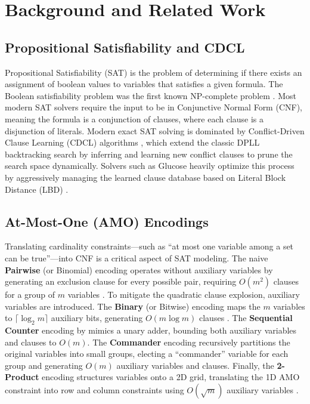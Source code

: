 \section{Background and Related Work}
\label{sec:background}

\subsection{Propositional Satisfiability and CDCL}
Propositional Satisfiability (SAT) is the problem of determining if there exists an assignment of boolean values to variables that satisfies a given formula. The Boolean satisfiability problem was the first known NP-complete problem \citep{cook1971complexity}. Most modern SAT solvers require the input to be in Conjunctive Normal Form (CNF), meaning the formula is a conjunction of clauses, where each clause is a disjunction of literals. Modern exact SAT solving is dominated by Conflict-Driven Clause Learning (CDCL) algorithms \citep{marques2009conflict}, which extend the classic DPLL backtracking search by inferring and learning new conflict clauses to prune the search space dynamically. Solvers such as Glucose heavily optimize this process by aggressively managing the learned clause database based on Literal Block Distance (LBD) \citep{audemard2009predicting}.

\subsection{At-Most-One (AMO) Encodings}
Translating cardinality constraints---such as ``at most one variable among a set can be true''---into CNF is a critical aspect of SAT modeling. The naive \textbf{Pairwise} (or Binomial) encoding operates without auxiliary variables by generating an exclusion clause for every possible pair, requiring $O(m^2)$ clauses for a group of $m$ variables \citep{frisch2005sat}. 
To mitigate the quadratic clause explosion, auxiliary variables are introduced. The \textbf{Binary} (or Bitwise) encoding maps the $m$ variables to $\lceil \log_2 m \rceil$ auxiliary bits, generating $O(m \log m)$ clauses \citep{frisch2005sat}. The \textbf{Sequential Counter} encoding by \cite{sinz2005towards} mimics a unary adder, bounding both auxiliary variables and clauses to $O(m)$. The \textbf{Commander} encoding \citep{klieber2007solving} recursively partitions the original variables into small groups, electing a ``commander'' variable for each group and generating $O(m)$ auxiliary variables and clauses. Finally, the \textbf{2-Product} encoding structures variables onto a 2D grid, translating the 1D AMO constraint into row and column constraints using $O(\sqrt{m})$ auxiliary variables \citep{chen2010new}. 


